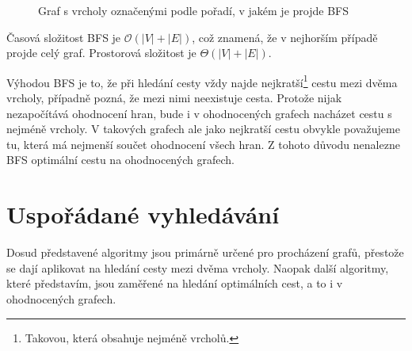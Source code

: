 \documentclass[12pt]{report}			%
\begin{document}
\begin{figure}[h]
\begin{center}
\caption{Graf s vrcholy označenými podle pořadí, v jakém je projde BFS} \label{grafBFS}
\end{center}
\end{figure}
Časová složitost BFS je $\mathcal{O}(|V| + |E|)$, což znamená, že v nejhorším případě projde celý graf. Prostorová složitost je $\Theta(|V| + |E|)$.

Výhodou BFS je to, že při hledání cesty vždy najde nejkratší\footnote{Takovou, která obsahuje nejméně vrcholů.} cestu mezi dvěma vrcholy, případně pozná, že mezi nimi neexistuje cesta. Protože nijak nezapočítává ohodnocení hran, bude i v ohodnocených grafech nacházet cestu s nejméně vrcholy. V takových grafech ale jako nejkratší cestu obvykle považujeme tu, která má nejmenší součet ohodnocení všech hran. Z tohoto důvodu nenalezne BFS optimální cestu na ohodnocených grafech.

		
			\section{Uspořádané vyhledávání}
			Dosud představené algoritmy jsou primárně určené pro procházení grafů, přestože se dají aplikovat na hledání cesty mezi dvěma vrcholy.
			Naopak další algoritmy, které představím, jsou zaměřené na hledání optimálních cest, a to i v ohodnocených grafech.
			
			
\end{document}
